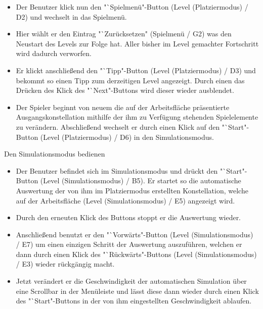 \begin{requirements}
\begin{itemize}
  			\item Der Benutzer klick nun den "`Spielmenü"-Button (Level (Platziermodus) / D2) und wechselt in das Spielmenü.
  			
  			\item Hier wählt er den Eintrag "`Zurücksetzen" (Spielmenü / G2) was den Neustart des Levels zur Folge hat. Aller bisher im Level gemachter Fortschritt wird dadurch verworfen.
  			
  			\item Er klickt anschließend den "`Tipp"-Button (Level (Platziermodus) / D3) und bekommt so einen Tipp zum derzeitigen Level angezeigt. Durch einen das Drücken des Klick des "`Next"-Buttons wird dieser wieder ausblendet.
  			
  			\item Der Spieler beginnt von neuem die auf der Arbeitsfläche präsentierte Ausgangskonstellation mithilfe der ihm zu Verfügung stehenden Spielelemente zu verändern. Abschließend wechselt er durch einen Klick auf den "`Start"-Button (Level (Platziermodus) / D6) in den Simulationsmodus.
  	\end{itemize}
  	
  	
  	
  	 Den Simulationsmodus bedienen
  	
	
	\begin{itemize}
	
  			\item Der Benutzer befindet sich im Simulationsmodus und drückt den "`Start"-Button (Level (Simulationsmodus) / B5). Er startet so die automatische Auswertung der von ihm im Platziermodus erstellten Konstellation, welche auf der Arbeitsfläche (Level (Simulationsmodus) / E5) angezeigt wird.
  			
  			\item Durch den erneuten Klick des Buttons stoppt er die Auswertung wieder.
  			
  			\item Anschließend benutzt er den "`Vorwärts"-Button (Level (Simulationsmodus) / E7) um einen einzigen Schritt der Auswertung auszuführen, welchen er dann durch einen Klick des "`Rückwärts"-Buttons (Level (Simulationsmodus) / E3) wieder rückgängig macht.
  			
  			\item Jetzt verändert er die Geschwindigkeit der automatischen Simulation über eine Scrollbar in der Menüleiste und lässt diese dann wieder durch einen Klick des "`Start"-Buttons in der von ihm eingestellten Geschwindigkeit ablaufen. 
  			

\end{itemize}
\end{requirements}
